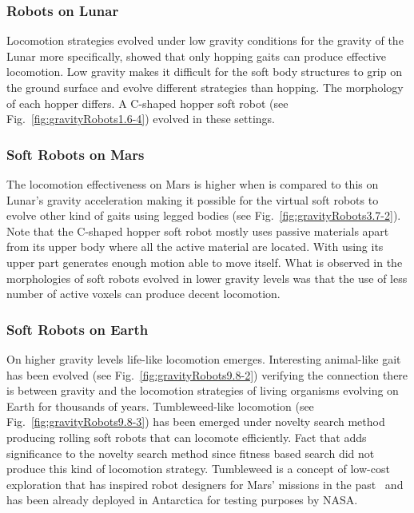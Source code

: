 \documentclass{sig-alternate}
\begin{document}
\subsubsection*{Robots on Lunar}

Locomotion strategies evolved under low gravity conditions for the gravity of the Lunar more specifically, showed that only hopping gaits can produce effective locomotion. Low gravity makes it difficult for the soft body structures to grip on the ground surface and evolve different strategies than hopping. The morphology of each hopper differs. A C-shaped hopper soft robot (see Fig.~\ref{fig:gravityRobots1.6-4}) evolved in these settings.

\subsubsection*{Soft Robots on Mars}

The locomotion effectiveness on Mars is higher when is compared to this on Lunar's gravity acceleration making it possible for the virtual soft robots to evolve other kind of gaits using legged bodies (see Fig.~\ref{fig:gravityRobots3.7-2}). Note that the C-shaped hopper soft robot mostly uses passive materials apart from its upper body where all the active material are located. With using its upper part generates enough motion able to move itself. What is observed in the morphologies of soft robots evolved in lower gravity levels was that the use of less number of active voxels can produce decent locomotion.

\subsubsection*{Soft Robots on Earth}

On higher gravity levels life-like locomotion emerges. Interesting animal-like gait has been evolved (see Fig.~\ref{fig:gravityRobots9.8-2}) verifying the connection there is between gravity and the locomotion strategies of living organisms evolving on Earth for thousands of years. Tumbleweed-like locomotion (see Fig.~\ref{fig:gravityRobots9.8-3}) has been emerged under novelty search method producing rolling soft robots that can locomote efficiently. Fact that adds significance to the novelty search method since fitness based search did not produce this kind of locomotion strategy. Tumbleweed is a concept of low-cost exploration that has inspired robot designers for Mars' missions in the past~\cite{antol2003low} and has been already deployed in Antarctica for testing purposes by NASA.
\end{document}
